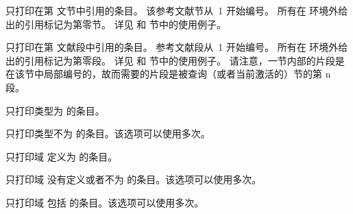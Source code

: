 \begin{optionlist*}
只打印在第  文节中引用的条目。
该参考文献节从~1 开始编号。
所有在  环境外给出的引用标记为第零节。
详见  和  节中的使用例子。



只打印在第  文献段中引用的条目。
参考文献段从~1 开始编号。
所有在  环境外给出的引用标记为第零段。
详见  和  节中的使用例子。
请注意，一节内部的片段是在该节中局部编号的，故而需要的片段是被查询（或者当前激活的）节的第 n 段。



只打印类型为  的条目。



只打印类型不为  的条目。该选项可以使用多次。



只打印域  定义为  的条目。



只打印域  没有定义或者不为  的条目。该选项可以使用多次。



只打印域  包括  的条目。该选项可以使用多次。


\end{optionlist*}
